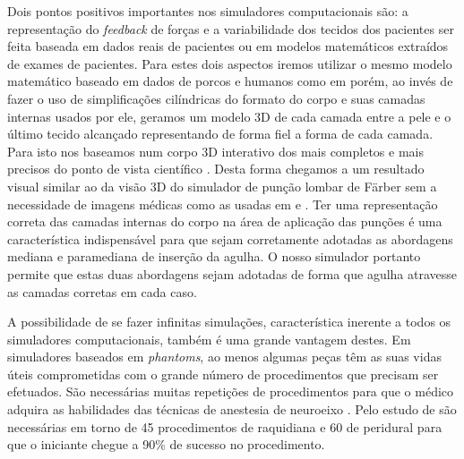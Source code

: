 Dois pontos positivos importantes nos simuladores computacionais são: a representação do \textit{feedback} de forças e a variabilidade dos tecidos dos pacientes ser feita baseada em dados reais de pacientes ou em modelos matemáticos extraídos de exames de pacientes. Para estes dois aspectos iremos utilizar o mesmo modelo matemático baseado em dados de porcos e humanos como em  porém, ao invés de fazer o uso de simplificações cilíndricas do formato do corpo e suas camadas internas usados por ele, geramos um modelo 3D de cada camada entre a pele e o último tecido alcançado representando de forma fiel a forma de cada camada. Para isto nos baseamos num corpo 3D interativo dos mais completos e mais precisos do ponto de vista científico \cite{BioDigitalInc2019}. Desta forma chegamos a um resultado visual similar ao da visão 3D do simulador de punção lombar de Färber sem a necessidade de imagens médicas como as usadas em  e \textcite{Dreifaldt2006}. Ter uma representação correta das camadas internas do corpo na área de aplicação das punções é uma característica indispensável para que sejam corretamente adotadas as abordagens mediana e paramediana de inserção da agulha. O nosso simulador portanto permite que estas duas abordagens sejam adotadas de forma que agulha atravesse as camadas corretas em cada caso. 

A possibilidade de se fazer infinitas simulações, característica inerente a todos os simuladores computacionais, também é uma grande vantagem destes. Em simuladores baseados em \textit{phantoms}, ao menos algumas peças têm as suas vidas úteis comprometidas com o grande número de procedimentos que precisam ser efetuados. São necessárias muitas repetições de procedimentos para que o médico adquira as habilidades das técnicas de anestesia de neuroeixo \cite{Konrad1998}. Pelo estudo de \textcite{Kopacz1996} são necessárias em torno de 45 procedimentos de raquidiana e 60 de peridural para que o iniciante chegue a 90\% de sucesso no procedimento.

